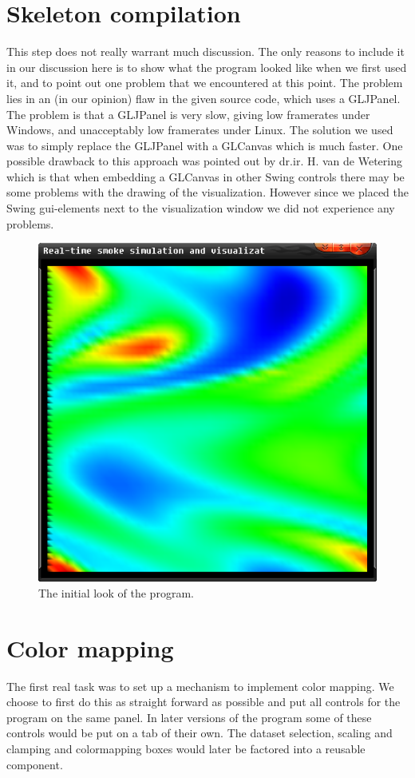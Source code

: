 \documentclass[a4paper,11pt,twoside]{report}
\begin{document}
	\section{Skeleton compilation}
		This step does not really warrant much discussion. The only reasons to include it in our discussion here is to show what the program looked like when we first used it, and to point out one problem that we encountered at this point. The problem lies in an (in our opinion) flaw in the given source code, which uses a GLJPanel. The problem is that a GLJPanel is very slow, giving low framerates under Windows, and unacceptably low framerates  under Linux. The solution we used was to simply replace the GLJPanel with a GLCanvas which is much faster. One possible drawback to this approach was pointed out by dr.ir. H. van de Wetering which is that when embedding a GLCanvas in other Swing controls there may be some problems with the drawing of the visualization. However since we placed the Swing gui-elements next to the visualization window we did not experience any problems.
		\begin{figure}[h]
		\centering
		\includegraphics[scale=\imagescalefactor]{images/step1.png}
		\caption{The initial look of the program.}\label{fig:step1}
		\end{figure}
		\clearpage
	\section{Color mapping}
		The first real task was to set up a mechanism to implement color mapping. We choose to first do this as straight forward as possible and put all controls for the program on the same panel. In later versions of the program some of these controls would be put on a tab of their own. The dataset selection, scaling and clamping and colormapping boxes would later be factored into a reusable component.
\end{document}
